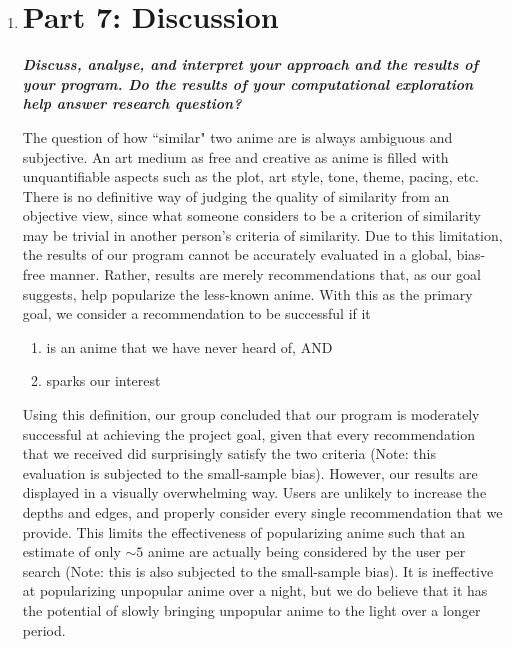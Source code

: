\documentclass[12pt]{article}
\begin{document}
\begin{enumerate}
\newpage

\item \section*{Part 7: Discussion}

\begin{text}

\textbf{\emph{Discuss, analyse, and interpret your approach and the results of your program. Do the results of your computational exploration help answer research question?}}

The question of how ``similar" two anime are is always ambiguous and subjective. An art medium as free and creative as anime is filled with unquantifiable aspects such as the plot, art style, tone, theme, pacing, etc. There is no definitive way of judging the quality of similarity from an objective view, since what someone considers to be a criterion of similarity may be trivial in another person's criteria of similarity. Due to this limitation, the results of our program cannot be accurately evaluated in a global, bias-free manner. Rather, results are merely recommendations that, as our goal suggests, help popularize the less-known anime. With this as the primary goal, we consider a recommendation to be successful if it
\begin{enumerate}
    \item is an anime that we have never heard of, AND
    \item sparks our interest
\end{enumerate}
Using this definition, our group concluded that our program is moderately successful at achieving the project goal, given that every recommendation that we received did surprisingly satisfy the two criteria (Note: this evaluation is subjected to the small-sample bias). However, our results are displayed in a visually overwhelming way. Users are unlikely to increase the depths and edges, and properly consider every single recommendation that we provide. This limits the effectiveness of popularizing anime such that an estimate of only $\sim5$ anime are actually being considered by the user per search (Note: this is also subjected to the small-sample bias). It is ineffective at popularizing unpopular anime over a night, but we do believe that it has the potential of slowly bringing unpopular anime to the light over a longer period.


\end{text}
\end{enumerate}
\end{document}
